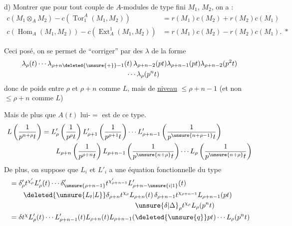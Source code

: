 d) Montrer que pour tout couple de $A$-modules de type fini $M_1$, $M_2$, on a :
\[
\begin{aligned}
c(M_1\otimes_A M_2)-c(\operatorname{Tor}_1^A(M_1,M_2))&=r(M_1)c(M_2)+r(M_2)c(M_1)\\
c(\operatorname{Hom}_A(M_1,M_2))-c(\operatorname{Ext}_A^1(M_1,M_2))&=r(M_1)c(M_2)-r(M_2)c(M_1).\;*
\end{aligned}
\]

Ceci posé, on  se permet de ``corriger'' par des $\lambda$  de la forme
\[
\begin{aligned}
&\lambda_{\rho}(t)\cdots\lambda_{\rho+n\deleted{\unsure{+}}-1}(t)\,\lambda_{\rho+n-2}(pt)\lambda_{\rho+n-1}(pt)\lambda_{\rho+n-2}(p^2t)\\
&\hspace{15em}\cdots\lambda_{\rho}(p^nt)
\end{aligned}
\]
donc de poids entre $\rho$ et $\rho+n$ comme $L$, mais de \uline{niveau} $\leq\rho+n-1$ (et non  $\leq\rho+n$ comme $L$)


Mais  de plus que $A(t)$ lui-$=$ est de  ce type.
\[
\begin{aligned}
L\left(\frac{1}{p^{n+\rho}t}\right)
 &=L'_{\rho}\left(\frac{1}{p^\rho t}\right)L'_{\rho+1}\left(\frac{1}{p^{\rho+1}t}\right)\cdots L'_{\rho+n-1}\left(\frac{1}{p^{\unsure{n+\rho-1}}t}\right)\\
 &\qquad L_{\rho+n}\left(\frac{1}{p^{\rho+n}t}\right)L_{\rho+n-1}\left(\frac{1}{p^{\unsure{n+\rho}}t}\right)\cdots L_{\rho}\left(\frac{1}{p^{\unsure{n+\rho}}t}\right)
\end{aligned}
\]
De plus, on suppose que  $L_i$ et $L'_i$ a une équation fonctionnelle du type 
\[
\begin{aligned}
&=\delta'_{\rho}t^{\chi'_{\rho}}L'_{\rho}(t)\cdots\delta'_{\unsure{\rho+n-1}}t^{\chi'_{\rho+n-1}}L'_{\rho+n-\unsure{i|1}}(t)\\
&\qquad \deleted{\unsure{L_t|L}}\delta_{\rho+n}t^{\chi_{\rho}}L_{\rho+n}(t)\,\delta_{\rho+n-1}t^{\chi_{\rho+n-1}}L_{\rho+n-1}(pt)\\
&\hspace{18em}\unsure{\delta|\Delta}_{\rho}t^{\chi_{\rho}}L_{\rho}(p^nt)\\
&=\delta t^\chi L'_{\rho}(t)\cdots L'_{\rho+n-1}(t)L_{\rho+n}(t)L_{\rho+n-1}(\deleted{\unsure{q}}pt)\cdots L_{\rho}(p^nt)
\end{aligned}
\]

